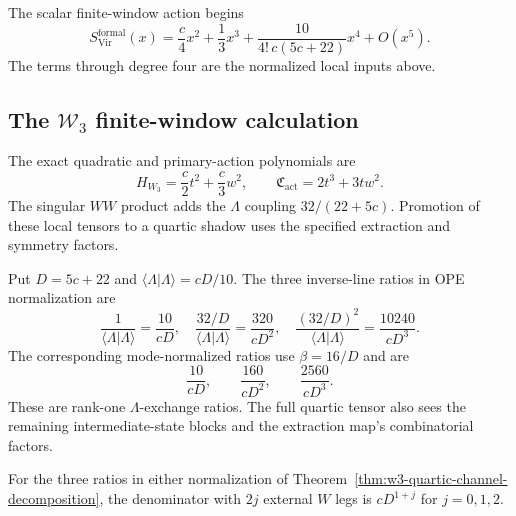 \begin{computation}
\label{comp:virasoro-branch-bv}
The scalar finite-window action begins
\[
S_{\mathrm{Vir}}^{\mathrm{formal}}(x)
=\frac c4x^2+\frac13x^3
+\frac{10}{4!\,c(5c+22)}x^4+O(x^5).
\]
The terms through degree four are the normalized local inputs above.
\end{computation}

\subsection{The $\mathcal W_3$ finite-window calculation}
\label{subsec:w3-shadow-archetype}

\begin{theorem}
\label{thm:w-w3-mixed-shadow}
The exact quadratic and primary-action polynomials are
\[
H_{W_3}=\frac c2t^2+\frac c3w^2,
\qquad
\mathfrak C_{\mathrm{act}}=2t^3+3tw^2.
\]
The singular $WW$ product adds the $\Lambda$ coupling
$32/(22+5c)$.  Promotion of these local tensors to a quartic shadow
uses the specified extraction and symmetry factors.
\end{theorem}

\begin{theorem}
\label{thm:w3-quartic-channel-decomposition}
Put $D=5c+22$ and
$\langle\Lambda|\Lambda\rangle=cD/10$.  The three inverse-line
ratios in OPE normalization are
\begin{equation}\label{eq:w3-ope-exchange-ratios-repaired}
\frac{1}{\langle\Lambda|\Lambda\rangle}=\frac{10}{cD},
\quad
\frac{32/D}{\langle\Lambda|\Lambda\rangle}=\frac{320}{cD^2},
\quad
\frac{(32/D)^2}{\langle\Lambda|\Lambda\rangle}
=\frac{10240}{cD^3}.
\end{equation}
The corresponding mode-normalized ratios use
$\beta=16/D$ and are
\begin{equation}\label{eq:w3-mode-exchange-ratios-repaired}
\frac{10}{cD},\qquad
\frac{160}{cD^2},\qquad
\frac{2560}{cD^3}.
\end{equation}
These are rank-one $\Lambda$-exchange ratios.  The full quartic tensor
also sees the remaining intermediate-state blocks and the extraction
map's combinatorial factors.
\end{theorem}

\begin{proposition}
\label{prop:w3-denominator-filtration}
For the three ratios in either normalization of
Theorem~\ref{thm:w3-quartic-channel-decomposition}, the denominator
with $2j$ external $W$ legs is $cD^{1+j}$ for $j=0,1,2$.
\end{proposition}

